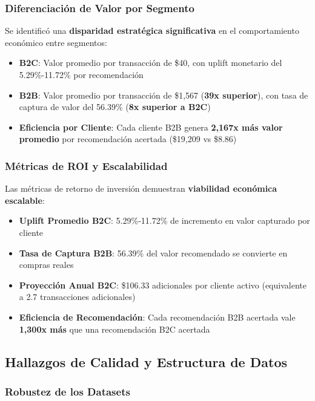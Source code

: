 \documentclass[twocolumn]{article}
\begin{document}
\subsubsection{Diferenciación de Valor por Segmento}

Se identificó una \textbf{disparidad estratégica significativa} en el comportamiento económico entre segmentos:
\begin{itemize}
    \item \textbf{B2C}: Valor promedio por transacción de \$40, con uplift monetario del 5.29\%-11.72\% por recomendación
    \item \textbf{B2B}: Valor promedio por transacción de \$1,567 (\textbf{39x superior}), con tasa de captura de valor del 56.39\% (\textbf{8x superior a B2C})
    \item \textbf{Eficiencia por Cliente}: Cada cliente B2B genera \textbf{2,167x más valor promedio} por recomendación acertada (\$19,209 vs \$8.86)
\end{itemize}

\subsubsection{Métricas de ROI y Escalabilidad}

Las métricas de retorno de inversión demuestran \textbf{viabilidad económica escalable}:
\begin{itemize}
    \item \textbf{Uplift Promedio B2C}: 5.29\%-11.72\% de incremento en valor capturado por cliente
    \item \textbf{Tasa de Captura B2B}: 56.39\% del valor recomendado se convierte en compras reales
    \item \textbf{Proyección Anual B2C}: \$106.33 adicionales por cliente activo (equivalente a 2.7 transacciones adicionales)
    \item \textbf{Eficiencia de Recomendación}: Cada recomendación B2B acertada vale \textbf{1,300x más} que una recomendación B2C acertada
\end{itemize}

\subsection{Hallazgos de Calidad y Estructura de Datos}

\subsubsection{Robustez de los Datasets}
\end{document}
